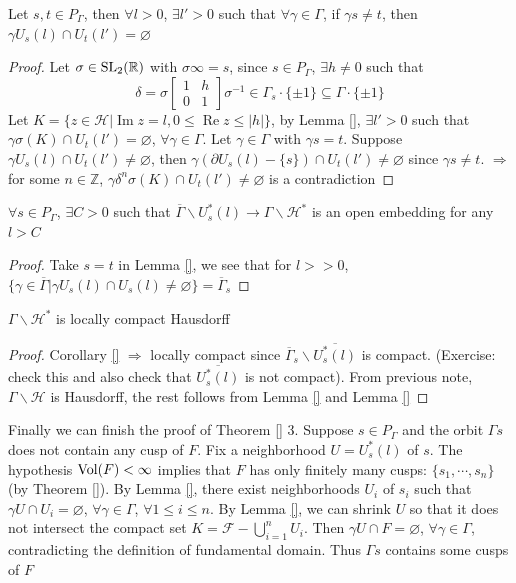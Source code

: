 \documentclass[main]{subfiles}
\begin{document}
\begin{lemma}
Let $s,t\in P_\Gamma$, then $\forall l>0$, $\exists l'>0$ such that $\forall\gamma\in\Gamma$, if $\gamma s\neq t$, then $\gamma U_s(l)\cap U_t(l')=\varnothing$
\end{lemma}

\begin{proof}
Let $\sigma\in\operatorname{SL}_2(\mathbb R)$ with $\sigma\infty=s$, since $s\in P_\Gamma$, $\exists h\neq0$ such that
\[\delta=\sigma\begin{bmatrix}
1&h \\
0&1
\end{bmatrix}\sigma^{-1}\in\Gamma_s\cdot\{\pm1\}\subseteq\Gamma\cdot\{\pm1\}\]
Let $K=\{z\in\mathcal H|\operatorname{Im}z=l,0\leq\operatorname{Re}z\leq|h|\}$, by Lemma \ref{}, $\exists l'>0$ such that $\gamma\sigma(K)\cap U_t(l')=\varnothing$, $\forall \gamma\in\Gamma$. Let $\gamma\in\Gamma$ with $\gamma s=t$. Suppose $\gamma U_s(l)\cap U_t(l')\neq\varnothing$, then $\gamma(\partial U_s(l)-\{s\})\cap U_t(l')\neq\varnothing$ since $\gamma s\neq t$. $\Rightarrow$ for some $n\in\mathbb Z$, $\gamma\delta^n\sigma(K)\cap U_t(l')\neq\varnothing$ is a contradiction
\end{proof}

\begin{corollary}
$\forall s\in P_\Gamma$, $\exists C>0$ such that $\overline\Gamma\backslash U^*_s(l)\to\Gamma\backslash\mathcal H^*$ is an open embedding for any $l>C$
\end{corollary}

\begin{proof}
Take $s=t$ in Lemma \ref{}, we see that for $l>>0$, $\{\gamma\in\overline\Gamma|\gamma U_s(l)\cap U_s(l)\neq\varnothing\}=\overline\Gamma_s$
\end{proof}

\begin{corollary}
$\Gamma\backslash\mathcal H^*$ is locally compact Hausdorff
\end{corollary}

\begin{proof}
Corollary \ref{} $\Rightarrow$ locally compact since $\overline\Gamma_s\backslash\overline{U^*_s(l)}$ is compact. (Exercise: check this and also check that $\overline{U^*_s(l)}$ is not compact). From previous note, $\Gamma\backslash\mathcal H$ is Hausdorff, the rest follows from Lemma \ref{} and Lemma \ref{}
\end{proof}

Finally we can finish the proof of Theorem \ref{} 3. Suppose $s\in P_\Gamma$ and the orbit $\Gamma s$ does not contain any cusp of $F$. Fix a neighborhood $U=U^*_s(l)$ of $s$. The hypothesis $\operatorname{Vol}(F)<\infty$ implies that $F$ has only finitely many cusps: $\{s_1,\cdots,s_n\}$ (by Theorem \ref{}). By Lemma \ref{}, there exist neighborhoods $U_i$ of $s_i$ such that $\gamma U\cap U_i=\varnothing$, $\forall\gamma\in\Gamma$, $\forall 1\leq i\leq n$. By Lemma \ref{}, we can shrink $U$ so that it does not intersect the compact set $K=\mathcal F-\bigcup_{i=1}^nU_i$. Then $\gamma U\cap F=\varnothing$, $\forall \gamma\in\Gamma$, contradicting the definition of fundamental domain. Thus $\Gamma s$ contains some cusps of $F$
\end{document}
